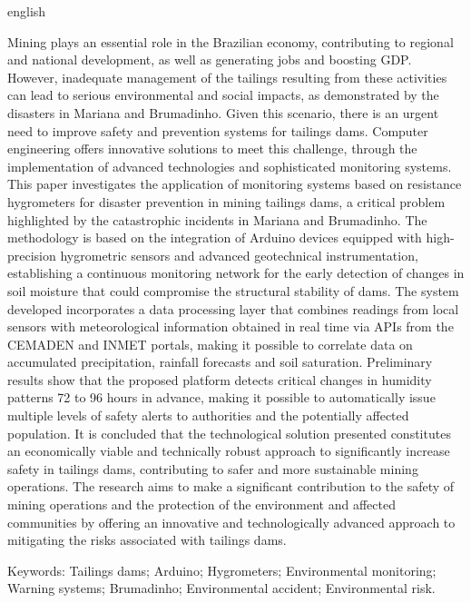 \begin{resumo}[Abstract]
\begin{otherlanguage*}{english}
\begin{SingleSpace}
Mining plays an essential role in the Brazilian economy, contributing to regional and national development, as well as generating jobs and boosting GDP. However, inadequate management of the tailings resulting from these activities can lead to serious environmental and social impacts, as demonstrated by the disasters in Mariana and Brumadinho. Given this scenario, there is an urgent need to improve safety and prevention systems for tailings dams. Computer engineering offers innovative solutions to meet this challenge, through the implementation of advanced technologies and sophisticated monitoring systems. This paper investigates the application of monitoring systems based on resistance hygrometers for disaster prevention in mining tailings dams, a critical problem highlighted by the catastrophic incidents in Mariana and Brumadinho. The methodology is based on the integration of Arduino devices equipped with high-precision hygrometric sensors and advanced geotechnical instrumentation, establishing a continuous monitoring network for the early detection of changes in soil moisture that could compromise the structural stability of dams. The system developed incorporates a data processing layer that combines readings from local sensors with meteorological information obtained in real time via APIs from the CEMADEN and INMET portals, making it possible to correlate data on accumulated precipitation, rainfall forecasts and soil saturation. Preliminary results show that the proposed platform detects critical changes in humidity patterns 72 to 96 hours in advance, making it possible to automatically issue multiple levels of safety alerts to authorities and the potentially affected population. It is concluded that the technological solution presented constitutes an economically viable and technically robust approach to significantly increase safety in tailings dams, contributing to safer and more sustainable mining operations. The research aims to make a significant contribution to the safety of mining operations and the protection of the environment and affected communities by offering an innovative and technologically advanced approach to mitigating the risks associated with tailings dams.

\vspace{\onelineskip}
\noindent Keywords: Tailings dams; Arduino; Hygrometers; Environmental monitoring; Warning systems; Brumadinho; Environmental accident; Environmental risk. 

\end{SingleSpace}
\end{otherlanguage*}
\end{resumo}